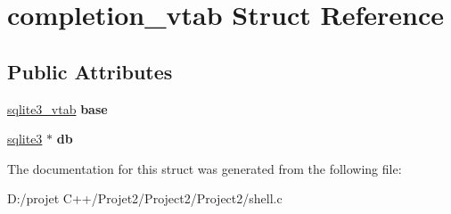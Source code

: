 \hypertarget{structcompletion__vtab}{}\section{completion\+\_\+vtab Struct Reference}
\label{structcompletion__vtab}
\subsection*{Public Attributes}
\begin{DoxyCompactItemize}
\item 
\mbox{\label{structcompletion__vtab_a804beffd31ad25d97da208dacb674189}} 
\mbox{\hyperlink{structsqlite3__vtab}{sqlite3\+\_\+vtab}} {\bfseries base}
\item 
\mbox{\label{structcompletion__vtab_a72ef3f960cc15adae864b45f7083938b}} 
\mbox{\hyperlink{structsqlite3}{sqlite3}} $\ast$ {\bfseries db}
\end{DoxyCompactItemize}


The documentation for this struct was generated from the following file\+:\begin{DoxyCompactItemize}
\item 
D\+:/projet C++/\+Projet2/\+Project2/\+Project2/shell.\+c\end{DoxyCompactItemize}
